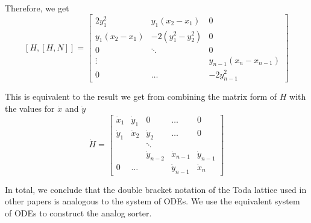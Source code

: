 Therefore, we get \\

\[[H,[H,N]] = 
\begin{bmatrix}
    2y_1^2 & y_1(x_2-x_1) & 0 \\
    y_1(x_2-x_1) & -2(y_1^2-y^2_2) & 0\\
    0 & \ddots & 0\\
    \vdots & & y_{n-1}(x_{n}-x_{n-1}) \\
    0 & \hdots & -2y^2_{n-1}
\end{bmatrix}
\]

This is equivalent to the result we get from combining the matrix form of $H$ with the values for $\dot{x}$ and $\dot{y}$
\[\dot{H} = \begin{bmatrix}
    \dot{x}_{1} & \dot{y}_{1} & 0  & \dots & 0 \\
    \dot{y}_{1} & \dot{x}_{2} & \dot{y}_{2} & \dots & 0 \\
     & & \ddots & \\
     & & \dot{y}_{n-2} & \dot{x}_{n-1} & \dot{y}_{n-1}\\
    0 & \hdots & & \dot{y}_{n-1} & \dot{x}_{n}
    
\end{bmatrix}\]

In total, we conclude that the double bracket notation of the Toda lattice used in other papers is analogous to the system of ODEs. We use the equivalent system of ODEs to construct the analog sorter.


